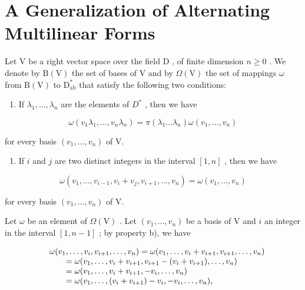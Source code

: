 \section{A Generalization of Alternating Multilinear Forms}

Let \(\mathrm{V}\) be a right vector space over the field \(\mathrm{D}\) , of finite dimension \(n \geqslant 0\) . We denote by \(\mathrm{B(V)}\) the set of bases of \(\mathrm{V}\) and by \(\Omega(\mathrm{V})\) the set of mappings \(\omega\) from \(\mathrm{B(V)}\) to \(\mathrm{D}_{\mathrm{ab}}^{*}\) that satisfy the following two conditions:

\begin{enumerate}
\def\labelenumi{\alph{enumi})}
\tightlist
\item
  If \(\lambda_1, \ldots, \lambda_n\) are the elements of \(D^*\) , then we have
\end{enumerate}

\[
\omega (v _ {1} \lambda_ {1}, \ldots , v _ {n} \lambda_ {n}) = \pi (\lambda_ {1} \dots \lambda_ {n}) \omega (v _ {1}, \ldots , v _ {n})\tag{1}
\]

for every basis \((v_{1},\ldots ,v_{n})\) of V.

\begin{enumerate}
\def\labelenumi{\alph{enumi})}
\setcounter{enumi}{1}
\tightlist
\item
  If \(i\) and \(j\) are two distinct integers in the interval \([1, n]\) , then we have
\end{enumerate}

\[
\omega (v _ {1}, \ldots , v _ {i - 1}, v _ {i} + v _ {j}, v _ {i + 1}, \ldots , v _ {n}) = \omega (v _ {1}, \ldots , v _ {n})\tag{2}
\]

for every basis \((v_{1},\ldots ,v_{n})\) of V.

Let \(\omega\) be an element of \(\Omega(\mathrm{V})\) . Let \((v_1, \ldots, v_n)\) be a basis of \(\mathrm{V}\) and \(i\) an integer in the interval \([1, n-1]\) ; by property b), we have

\[
\begin{array}{r l} & {\omega (v _ {1}, \ldots , v _ {i}, v _ {i + 1}, \ldots , v _ {n}) = \omega (v _ {1}, \ldots , v _ {i} + v _ {i + 1}, v _ {i + 1}, \ldots , v _ {n})} \\ & {\qquad = \omega (v _ {1}, \ldots , v _ {i} + v _ {i + 1}, v _ {i + 1} - (v _ {i} + v _ {i + 1}), \ldots , v _ {n})} \\ & {\qquad = \omega (v _ {1}, \ldots , v _ {i} + v _ {i + 1}, - v _ {i}, \ldots , v _ {n})} \\ & {\qquad = \omega (v _ {1}, \ldots , (v _ {i} + v _ {i + 1}) - v _ {i}, - v _ {i}, \ldots , v _ {n}),} \end{array}
\]

